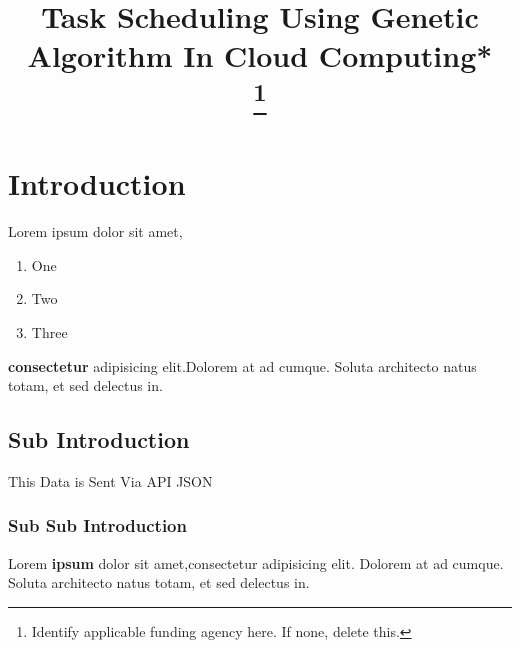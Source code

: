 \documentclass[conference]{IEEEtran}%
\begin{document}
%
\normalsize%
\title{Task Scheduling Using Genetic Algorithm In Cloud Computing*\\
{\footnotesize }
\thanks{Identify applicable funding agency here. If none, delete this.}
}%
\author{
\and
{}
\and
{}
}%
\maketitle%
\section{Introduction}%
\label{sec:Introduction}%
Lorem ipsum dolor sit amet, \begin{enumerate}\item One\item Two\item Three\end{enumerate} \textbf{consectetur} adipisicing elit.Dolorem at ad cumque. Soluta architecto natus totam, \cite{Sample2024} et sed delectus in.%
\subsection{Sub Introduction}%
\label{subsec:SubIntroduction}%
This Data is Sent Via API JSON%
\subsubsection{Sub Sub Introduction}%
\label{ssubsec:SubSubIntroduction}%
Lorem \textbf{ipsum} dolor sit amet,consectetur adipisicing elit. Dolorem at ad cumque. Soluta architecto natus totam, et sed delectus in.

%
\end{document}
